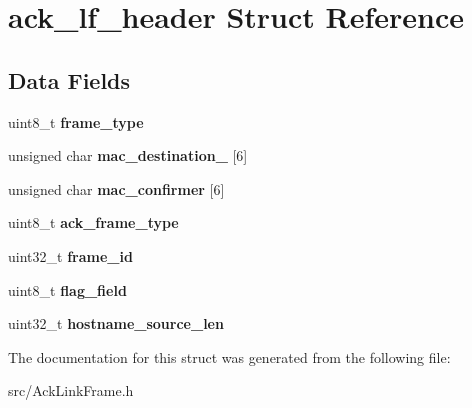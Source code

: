\hypertarget{structack__lf__header}{\section{ack\-\_\-lf\-\_\-header Struct Reference}
\label{structack__lf__header}
}
\subsection*{Data Fields}
\begin{DoxyCompactItemize}
\item 
\hypertarget{structack__lf__header_aa1bc16939bb29911d15536eda49fb5b1}{uint8\-\_\-t {\bfseries frame\-\_\-type}}\label{structack__lf__header_aa1bc16939bb29911d15536eda49fb5b1}

\item 
\hypertarget{structack__lf__header_ac7d7fdba59d6a4e7c61ca8ea76b7a8f9}{unsigned char {\bfseries mac\-\_\-destination\-\_\-} \mbox{[}6\mbox{]}}\label{structack__lf__header_ac7d7fdba59d6a4e7c61ca8ea76b7a8f9}

\item 
\hypertarget{structack__lf__header_a1dd6d818e8e2c88fcc31d7fc32ea9266}{unsigned char {\bfseries mac\-\_\-confirmer} \mbox{[}6\mbox{]}}\label{structack__lf__header_a1dd6d818e8e2c88fcc31d7fc32ea9266}

\item 
\hypertarget{structack__lf__header_a7838a12d17fddd85d399971d27a85c49}{uint8\-\_\-t {\bfseries ack\-\_\-frame\-\_\-type}}\label{structack__lf__header_a7838a12d17fddd85d399971d27a85c49}

\item 
\hypertarget{structack__lf__header_a71b653ceb8590c8aebd418c10d1a66d1}{uint32\-\_\-t {\bfseries frame\-\_\-id}}\label{structack__lf__header_a71b653ceb8590c8aebd418c10d1a66d1}

\item 
\hypertarget{structack__lf__header_a1a60357ddbb969cadef3efdf53da53a1}{uint8\-\_\-t {\bfseries flag\-\_\-field}}\label{structack__lf__header_a1a60357ddbb969cadef3efdf53da53a1}

\item 
\hypertarget{structack__lf__header_a9360b94aa6d12bb333c3b4b1201d958a}{uint32\-\_\-t {\bfseries hostname\-\_\-source\-\_\-len}}\label{structack__lf__header_a9360b94aa6d12bb333c3b4b1201d958a}

\end{DoxyCompactItemize}


The documentation for this struct was generated from the following file\-:\begin{DoxyCompactItemize}
\item 
src/Ack\-Link\-Frame.\-h\end{DoxyCompactItemize}
